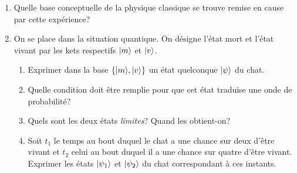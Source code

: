 \begin{enumerate}
\item Quelle base conceptuelle de la physique classique se trouve remise en
cause par cette expérience?

\item On se place dans la situation quantique. On désigne l'état mort et
l'état vivant par les kets respectifs $\vert m\rangle$ et $\vert v\rangle$.

\begin{enumerate}
\item Exprimer dans la base $\{\vert m\rangle,\vert v\rangle\} $ un état quelconque
$\vert\psi\rangle$ du chat.

\item Quelle condition doit être remplie pour que cet état traduise une onde
de probabilité?

\item Quels sont les deux états \emph{limites}? Quand les obtient-on?

\item Soit $t_1$ le temps au bout duquel le chat a une chance sur deux d'être
vivant et $t_2$ celui au bout duquel il a une chance sur quatre d'être vivant.
Exprimer les états $\vert\psi_1\rangle$ et $\vert\psi_2\rangle$ du chat correspondant à
ces instants.
\end{enumerate}
\end{enumerate}

